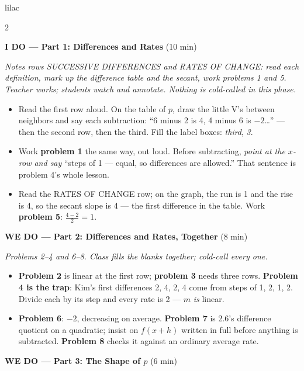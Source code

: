 \documentclass[10pt]{article}
\begin{document}
\begin{skillbox}{lilac}
\begin{multicols}{2}

\textbf{I DO --- Part 1: Differences and Rates} (10 min)

\textit{Notes rows SUCCESSIVE DIFFERENCES and RATES OF CHANGE: read each definition, mark up the
difference table and the secant, work problems 1 and 5. Teacher works; students watch and
annotate. Nothing is cold-called in this phase.}
\begin{itemize}
  \item Read the first row aloud. On the table of $p$, draw the little V's between neighbors and
        say each subtraction: ``6 minus 2 is 4, 4 minus 6 is $-2$\ldots'' --- then the second row,
        then the third. Fill the label boxes: \textit{third}, \textit{3}.
  \item Work \textbf{problem 1} the same way, out loud. Before subtracting, \emph{point at the
        $x$-row and say} ``steps of 1 --- equal, so differences are allowed.'' That sentence is
        problem 4's whole lesson.
  \item Read the RATES OF CHANGE row; on the graph, the run is 1 and the rise is 4, so the
        secant slope is 4 --- the first difference in the table. Work \textbf{problem 5}:
        $\frac{4 - 2}{2} = 1$.
\end{itemize}

\textbf{WE DO --- Part 2: Differences and Rates, Together} (8 min)

\textit{Problems 2--4 and 6--8. Class fills the blanks together; cold-call every one.}
\begin{itemize}
  \item \textbf{Problem 2} is linear at the first row; \textbf{problem 3} needs three rows.
        \textbf{Problem 4 is the trap}: Kim's first differences 2, 4, 2, 4 come from steps of 1,
        2, 1, 2. Divide each by its step and every rate is 2 --- $m$ \emph{is} linear.
  \item \textbf{Problem 6}: $-2$, decreasing on average. \textbf{Problem 7} is 2.6's difference
        quotient on a quadratic; insist on $f(x + h)$ written in full before anything is
        subtracted. \textbf{Problem 8} checks it against an ordinary average rate.
\end{itemize}

\columnbreak

\textbf{WE DO --- Part 3: The Shape of $p$} (6 min)


\end{multicols}
\end{skillbox}
\end{document}
